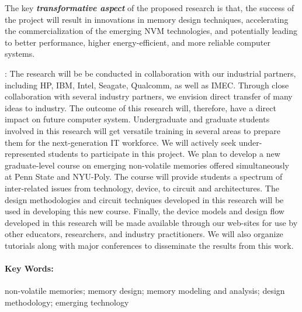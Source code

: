 \documentclass[11pt,letterpaper]{article}
\begin{document}
The key \textit{\textbf{transformative aspect}} of the proposed research is that, the success of the project will result in innovations in memory design techniques, accelerating the commercialization of the emerging NVM technologies, and potentially leading to better performance, higher energy-efficient, and more reliable computer systems.

{}: The research will be be conducted in collaboration with our industrial partners, including HP, IBM, Intel, Seagate, Qualcomm, as well as IMEC. Through close collaboration with several industry partners, we envision direct transfer of many ideas to industry. The outcome of this research will, therefore, have a direct impact on future computer system. Undergraduate and graduate students involved in this research will get versatile training in several areas to prepare them for the next-generation IT workforce. We will actively seek under-represented students to participate in this project. We plan to develop a new graduate-level course on emerging non-volatile memories offered simultaneously at Penn State and NYU-Poly. The course will provide students a spectrum of inter-related issues from technology, device, to circuit and architectures. The design methodologies and circuit techniques developed in this research will be used in developing this new course. Finally, the device models and design flow developed in this research will be made available through our web-sites for use by other educators, researchers, and industry practitioners. We will also organize tutorials along with major conferences to disseminate the results from this work.

\paragraph{\textbf{Key Words:}} non-volatile memories; memory design; memory modeling and analysis; design methodology; emerging technology
\end{document}
